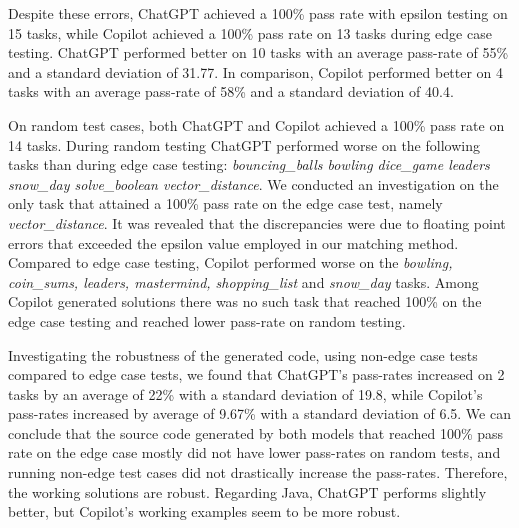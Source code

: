 Despite these errors, ChatGPT achieved a 100\% pass rate with epsilon testing on 15 tasks, while Copilot achieved a 100\% pass rate on 13 tasks during edge case testing.
ChatGPT performed better on 10 tasks with an average pass-rate of 55\% and a standard deviation of 31.77.
In comparison, Copilot performed better on 4 tasks with an average pass-rate of 58\% and a standard deviation of 40.4.

On random test cases, both ChatGPT and Copilot achieved a 100\% pass rate on 14 tasks.
During random testing ChatGPT performed worse on the following tasks than during edge case testing:
\textit{bouncing\_balls
	bowling
	dice\_game
	leaders
	snow\_day
	solve\_boolean
	vector\_distance}.
We conducted an investigation on the only task that attained a 100\% pass rate on the edge case test, namely \textit{vector\_distance}.
It was revealed that the discrepancies were due to floating point errors that exceeded the epsilon value employed in our matching method.
Compared to edge case testing, Copilot performed worse on the \textit{bowling, coin\_sums, leaders, mastermind, shopping\_list} and \textit{snow\_day} tasks.
Among Copilot generated solutions there was no such task that reached 100\% on the edge case testing and reached lower pass-rate on random testing.

Investigating the robustness of the generated code, using non-edge case tests compared to edge case tests, we found that ChatGPT's pass-rates increased on 2 tasks by an average of 22\% with a standard deviation of 19.8, while Copilot's pass-rates increased by average of 9.67\% with a standard deviation of 6.5.
We can conclude that the source code generated by both models that reached 100\% pass rate on the edge case mostly did not have lower pass-rates on random tests, and running non-edge test cases did not drastically increase the pass-rates.
Therefore, the working solutions are robust.
Regarding Java, ChatGPT performs slightly better, but Copilot's working examples seem to be more robust.


